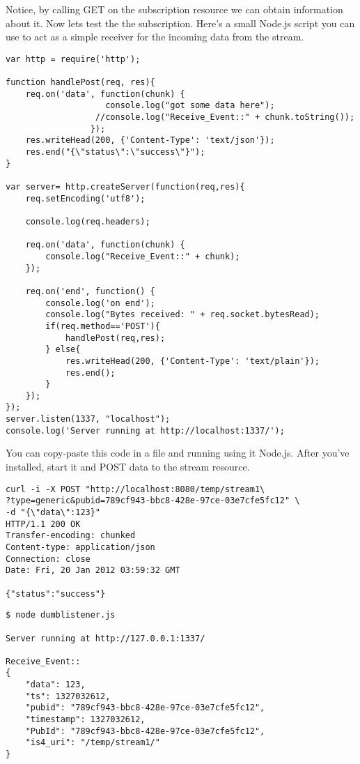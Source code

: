 Notice, by calling GET on the subscription resource we can obtain information about it. Now lets test the the subscription. Here's a small  Node.js script you can use to act as a simple receiver for the incoming data from the stream.

\begin{lstlisting}
var http = require('http');

function handlePost(req, res){
    req.on('data', function(chunk) {
                    console.log("got some data here");
                  //console.log("Receive_Event::" + chunk.toString());
                 });
    res.writeHead(200, {'Content-Type': 'text/json'});
    res.end("{\"status\":\"success\"}");
}

var server= http.createServer(function(req,res){
    req.setEncoding('utf8');

    console.log(req.headers);

    req.on('data', function(chunk) {
        console.log("Receive_Event::" + chunk);
    });

    req.on('end', function() {
        console.log('on end');
        console.log("Bytes received: " + req.socket.bytesRead);
        if(req.method=='POST'){
            handlePost(req,res);
        } else{
            res.writeHead(200, {'Content-Type': 'text/plain'});
            res.end();
        }
    });
});
server.listen(1337, "localhost");
console.log('Server running at http://localhost:1337/');
\end{lstlisting}

You can copy-paste this code in a file and running using it  Node.js. After you've installed, start it and POST data to the stream resource.

\begin{lstlisting}
curl -i -X POST "http://localhost:8080/temp/stream1\
?type=generic&pubid=789cf943-bbc8-428e-97ce-03e7cfe5fc12" \
-d "{\"data\":123}"
HTTP/1.1 200 OK
Transfer-encoding: chunked
Content-type: application/json
Connection: close
Date: Fri, 20 Jan 2012 03:59:32 GMT

{"status":"success"}
\end{lstlisting}

\begin{lstlisting}
$ node dumblistener.js 

Server running at http://127.0.0.1:1337/
    
Receive_Event::
{
    "data": 123,
    "ts": 1327032612,
    "pubid": "789cf943-bbc8-428e-97ce-03e7cfe5fc12",
    "timestamp": 1327032612,
    "PubId": "789cf943-bbc8-428e-97ce-03e7cfe5fc12",
    "is4_uri": "/temp/stream1/"
}
\end{lstlisting}

